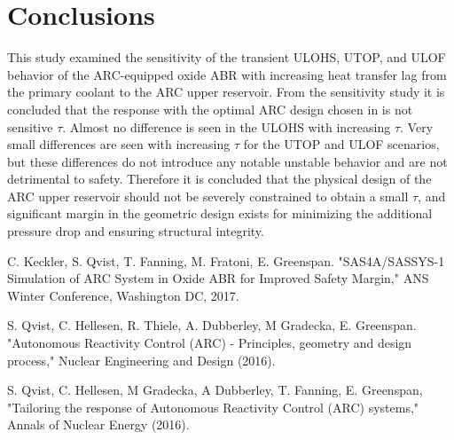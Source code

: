 \documentclass[11pt, oneside]{article}   	%
\begin{document}
\section{Conclusions}
This study examined the sensitivity of the transient ULOHS, UTOP, and ULOF behavior of the ARC-equipped oxide ABR with increasing heat transfer lag from the primary coolant to the ARC upper reservoir.
From the sensitivity study it is concluded that the response with the optimal ARC design chosen in \cite{2017ANSWinter_ARC} is not sensitive $\tau$.
Almost no difference is seen in the ULOHS with increasing $\tau$.
Very small differences are seen with increasing $\tau$ for the UTOP and ULOF scenarios, but these differences do not introduce any notable unstable behavior and are not detrimental to safety.
Therefore it is concluded that the physical design of the ARC upper reservoir should not be severely constrained to obtain a small $\tau$, and significant margin in the geometric design exists for minimizing the additional pressure drop and ensuring structural integrity.

\begin{thebibliography}{9}

C. Keckler, S. Qvist, T. Fanning, M. Fratoni, E. Greenspan. "SAS4A/SASSYS-1 Simulation of ARC System in Oxide ABR for Improved Safety Margin," ANS Winter Conference, Washington DC, 2017.

S. Qvist, C. Hellesen, R. Thiele, A. Dubberley, M Gradecka, E. Greenspan. "Autonomous Reactivity Control (ARC) - Principles, geometry and design process," Nuclear Engineering and Design (2016).

S. Qvist, C. Hellesen, M Gradecka, A Dubberley, T. Fanning, E. Greenspan, "Tailoring the response of Autonomous Reactivity Control (ARC) systems," Annals of Nuclear Energy (2016).

\end{thebibliography}
\end{document}
